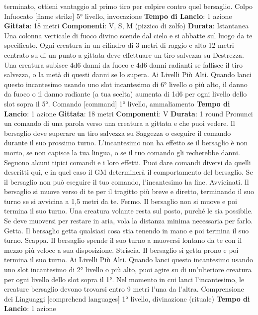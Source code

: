 \begin{multicols}{2}
terminato, ottieni vantaggio al primo tiro per colpire
contro quel bersaglio.
Colpo Infuocato
[flame strike]
5° livello, invocazione
\textbf{Tempo di Lancio}: 1 azione
\textbf{Gittata}: 18 metri
\textbf{Componenti}: V, S, M (pizzico di zolfo)
\textbf{Durata}: Istantanea
Una colonna verticale di fuoco divino scende dal cielo e
si abbatte sul luogo da te specificato. Ogni creatura in
un cilindro di 3 metri di raggio e alto 12 metri centrato
su di un punto a gittata deve effettuare un tiro salvezza
su Destrezza. Una creatura subisce 4d6 danni da fuoco
e 4d6 danni radianti se fallisce il tiro salvezza, o la metà
di questi danni se lo supera.
Ai Livelli Più Alti. Quando lanci questo incantesimo
usando uno slot incantesimo di 6° livello o più alto, il
danno da fuoco o il danno radiante (a tua scelta)
aumenta di 1d6 per ogni livello dello slot sopra il 5°.
Comando
[command]
1° livello, ammaliamento
\textbf{Tempo di Lancio}: 1 azione
\textbf{Gittata}: 18 metri
\textbf{Componenti}: V
\textbf{Durata}: 1 round
Pronunci un comando di una parola verso una creatura
a gittata e che puoi vedere. Il bersaglio deve superare
un tiro salvezza su Saggezza o eseguire il comando
durante il suo prossimo turno. L’incantesimo non ha
effetto se il bersaglio è non morto, se non capisce la tua
lingua, o se il tuo comando gli recherebbe danni.
Seguono alcuni tipici comandi e i loro effetti. Puoi dare
comandi diversi da quelli descritti qui, e in quel caso il
GM determinerà il comportamento del bersaglio. Se il
bersaglio non può eseguire il tuo comando,
l’incantesimo ha fine.
Avvicinati. Il bersaglio si muove verso di te per il
tragitto più breve e diretto, terminando il suo turno se si
avvicina a 1,5 metri da te.
Fermo. Il bersaglio non si muove e poi termina il suo
turno. Una creatura volante resta sul posto, purché le
sia possibile. Se deve muoversi per restare in aria, vola
la distanza minima necessaria per farlo.
Getta. Il bersaglio getta qualsiasi cosa stia tenendo in
mano e poi termina il suo turno.
Scappa. Il bersaglio spende il suo turno a muoversi
lontano da te con il mezzo più veloce a sua
disposizione.
Striscia. Il bersaglio si getta prono e poi termina il suo
turno.
Ai Livelli Più Alti. Quando lanci questo incantesimo
usando uno slot incantesimo di 2° livello o più alto, puoi
agire su di un’ulteriore creatura per ogni livello dello slot
sopra il 1°. Nel momento in cui lanci l’incantesimo, le
creature bersaglio devono trovarsi entro 9 metri l’una da
l’altra.
Comprensione dei Linguaggi
[comprehend languages]
1° livello, divinazione (rituale)
\textbf{Tempo di Lancio}: 1 azione

\end{multicols}
